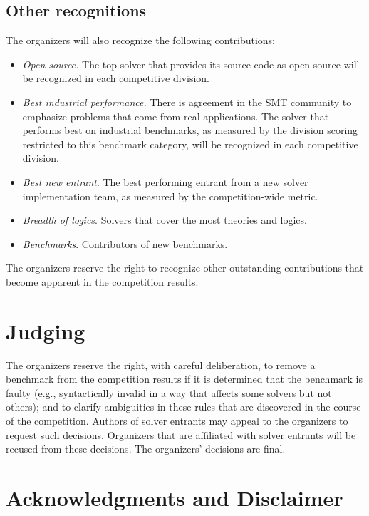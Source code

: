 \documentclass[12pt]{article}
\begin{document}
\subsection{Other recognitions}

The organizers will also recognize the following contributions:
%
\begin{itemize}
\item \emph{Open source.}  The top solver that provides its source
  code as open source will be recognized in each competitive division.
\item \emph{Best industrial performance.}  There is agreement in the
  SMT community to emphasize problems that come from real
  applications.  The solver that performs best on industrial
  benchmarks, as measured by the division scoring restricted to this
  benchmark category, will be recognized in each competitive division.
\item {\em Best new entrant}. The best performing entrant from a new
  solver implementation team, as measured by the competition-wide
  metric.
\item {\em Breadth of logics}. Solvers that cover the most theories
  and logics.
\item {\em Benchmarks}. Contributors of new benchmarks.
\end{itemize}
%
The organizers reserve the right to recognize other outstanding
contributions that become apparent in the competition results.


\section{Judging}

The organizers reserve the right, with careful deliberation, to remove
a benchmark from the competition results if it is determined that the
benchmark is faulty (e.g., syntactically invalid in a way that affects
some solvers but not others); and to clarify ambiguities in these
rules that are discovered in the course of the competition.  Authors
of solver entrants may appeal to the organizers to request such
decisions.  Organizers that are affiliated with solver entrants will
be recused from these decisions.  The organizers' decisions are final.


\section{Acknowledgments and Disclaimer}
\end{document}
